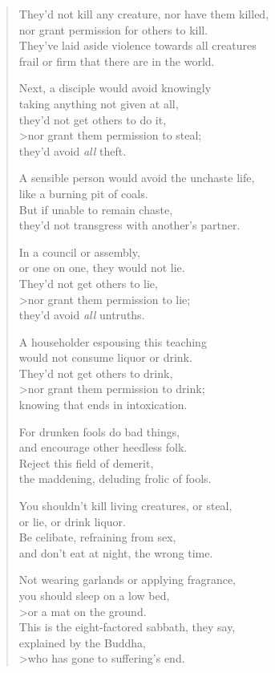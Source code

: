 \documentclass[12pt,openany]{book}%
\begin{document}
\begin{verse}
They’d not kill any creature, nor have them killed, \\
nor grant permission for others to kill. \\
They’ve laid aside violence towards all creatures \\
frail or firm that there are in the world. 

Next, a disciple would avoid knowingly \\
taking anything not given at all, \\
they’d not get others to do it, \\>nor grant them permission to steal; \\
they’d avoid \emph{all} theft. 

A sensible person would avoid the unchaste life, \\
like a burning pit of coals. \\
But if unable to remain chaste, \\
they’d not transgress with another’s partner. 

In a council or assembly, \\
or one on one, they would not lie. \\
They’d not get others to lie, \\>nor grant them permission to lie; \\
they’d avoid \emph{all} untruths. 

A householder espousing this teaching \\
would not consume liquor or drink. \\
They’d not get others to drink, \\>nor grant them permission to drink; \\
knowing that ends in intoxication. 

For drunken fools do bad things, \\
and encourage other heedless folk. \\
Reject this field of demerit, \\
the maddening, deluding frolic of fools. 

You shouldn’t kill living creatures, or steal, \\
or lie, or drink liquor. \\
Be celibate, refraining from sex, \\
and don’t eat at night, the wrong time. 

Not wearing garlands or applying fragrance, \\
you should sleep on a low bed, \\>or a mat on the ground. \\
This is the eight-factored sabbath, they say, \\
explained by the Buddha, \\>who has gone to suffering’s end. 


\end{verse}
\end{document}
